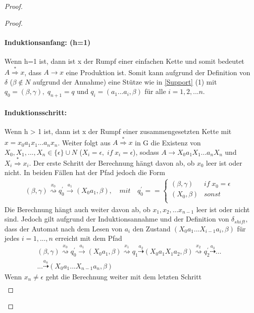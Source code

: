 \begin{proof}
\begin{proof}
\paragraph*{Induktionsanfang: (h=1)}
Wenn h=1 ist, dann ist x der Rumpf einer einfachen Kette und somit bedeutet $A \stackrel{*} {\Rightarrow} x$, dass $A \rightarrow x$ eine Produktion ist. Somit kann aufgrund der Definition von $\delta$ ($\beta \notin N$ aufgrund der Annahme) eine Stütze wie in \autoref{Support} (1) mit $q_0=(\beta, \gamma), \; q_{n+1}=q$ und $q_i=(a_1...a_i, \beta)$ für alle $i=1,2,...n$.
\paragraph*{Induktionsschritt:}
Wenn h > 1 ist, dann ist x der Rumpf einer zusammengesetzten Kette mit $x=x_0a_1x_1...a_nx_n$. Weiter folgt aus $A\stackrel{*}{\Rightarrow}x$ in G die Existenz von $X_0, X_1, ...,X_n \in \{\epsilon\}\cup N$ ($X_i = \epsilon, \; if \; x_i=\epsilon$), sodass $A\rightarrow X_0a_1X_1...a_nX_n$ und $X_i \stackrel{*}{\Rightarrow}x_i$. Der erste Schritt der Berechnung hängt davon ab, ob $x_0$ leer ist oder nicht. In beiden Fällen hat der Pfad jedoch die Form
\begin{eqnarray*}
(\beta, \gamma) \stackrel{x_0}{\rightsquigarrow} q_0^\prime \stackrel{a_1}{\rightarrow} (X_0a_1, \beta), \quad mit \quad q_0^\prime= = \begin{cases}
(\beta, \gamma) & if \; x_0 = \epsilon \\
(X_0, \beta) & sonst \\
\end{cases}
\end{eqnarray*}
Die Berechnung hängt auch weiter davon ab, ob $x_1, x_2,...x_{n-1}$ leer ist oder nicht sind. Jedoch gilt aufgrund der Induktionsannahme und der Definition von $\delta_{shift}$, dass der Automat nach dem Lesen von $a_i$ den Zustand $(X_0a_1...X_{i-1}a_i, \beta)$ für jedes $i=1,...,n$ erreicht mit dem Pfad 
\begin{multline*}
(\beta, \gamma) \stackrel{x_0}{\rightsquigarrow} q_0^\prime \stackrel{a_1}{\rightarrow} (X_0a_1, \beta) \stackrel{x_1}{\rightsquigarrow}q_1 \stackrel{a_2}{\dashrightarrow}(X_0a_1X_1a_2, \beta) \stackrel{x_2}{\rightsquigarrow} q_2^\prime \stackrel{a_3}{\dashrightarrow}... \\
...\stackrel{a_n}{\dashrightarrow} (X_0a_1...X_{n-1}a_n, \beta)
\end{multline*}
Wenn $x_n \neq \epsilon$ geht die Berechnung weiter mit dem letzten Schritt
\begin{eqnarray*}

\end{eqnarray*}
\end{proof}
\end{proof}
